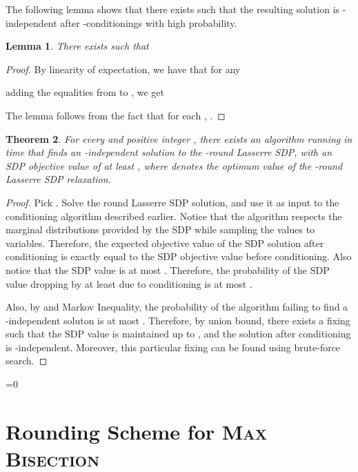 \documentclass[11pt]{article}
\def\full{1}
\newtheorem{theorem}{Theorem}[section]
\newtheorem{lemma}[theorem]{Lemma}
\theoremstyle{definition}
\newcommand{\problemmacro}[1]{\texorpdfstring{\textsc{#1}}{#1}\xspace}
\newcommand{\maxbisection}{\problemmacro{Max Bisection}}
\numberwithin{equation}{section}
\let\pref=\prettyref
\begin{document}
The following lemma shows that there exists  such that the
resulting solution is -independent after -conditionings with high probability.
\begin{lemma} \label{lem:existlowmi}
There exists  such that 
\end{lemma}

\begin{proof}
By linearity of expectation, we have that for any 

adding the equalities from  to , we get

The lemma follows from the fact that for each , .
\end{proof}


\begin{theorem}  \label{thm:alphaindependentsol}
For every  and positive integer , there exists an algorithm running in time
 that finds an
-independent solution to the -round Lasserre SDP,
with an SDP objective value of at least , where 
denotes the optimum value of the -round Lasserre SDP relaxation.
\end{theorem}

\begin{proof}
Pick .  Solve the  round Lasserre
SDP solution, and use it as input to the conditioning algorithm
described earlier.  Notice that the algorithm respects the marginal
distributions provided by the SDP while sampling the values to
variables.  Therefore, the expected objective value of the SDP
solution after conditioning is exactly equal to the SDP objective
value before conditioning. Also notice that the SDP value is at most
. Therefore, the probability of the SDP value dropping by at least
 due to conditioning is at most .

Also, by \pref{lem:existlowmi} and Markov Inequality, the probability
of the algorithm failing to find a -independent soluton is at most .
Therefore, by union bound, there exists a fixing such that the SDP
value is maintained up to , and the solution after
conditioning is -independent. Moreover, this particular fixing
can be found using brute-force search.

\end{proof}









\ifnum\full=0 \vspace{-8pt}\fi
\section{Rounding Scheme for \maxbisection} \label{sec:rounding}
\end{document}
